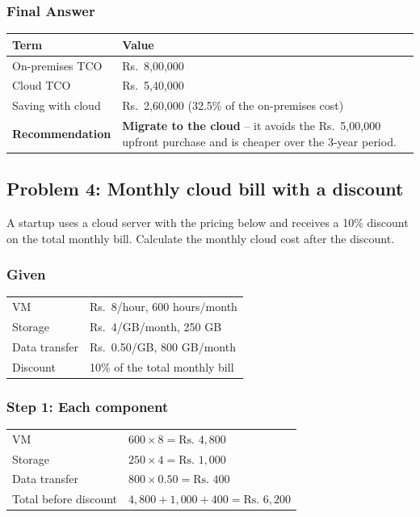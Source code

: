 \documentclass[11pt,a4paper]{article}
\begin{document}
\subsubsection*{Final Answer}

\begin{tabularx}{\textwidth}{@{}lX@{}}
\toprule
\rowcolor{tablehead}\textbf{Term} & \textbf{Value} \\
\midrule
On-premises TCO & Rs.\ 8,00,000 \\
Cloud TCO & Rs.\ 5,40,000 \\
Saving with cloud & Rs.\ 2,60,000 (32.5\% of the on-premises cost) \\
\textbf{Recommendation} & \textbf{Migrate to the cloud} -- it avoids the Rs.\ 5,00,000
  upfront purchase and is cheaper over the 3-year period. \\
\bottomrule
\end{tabularx}

\subsection*{Problem 4: Monthly cloud bill with a discount}

A startup uses a cloud server with the pricing below and receives a 10\% discount on the total
monthly bill. Calculate the monthly cloud cost after the discount.

\subsubsection*{Given}

\begin{tabularx}{\textwidth}{@{}lX@{}}
VM & Rs.\ 8/hour, 600 hours/month \\
Storage & Rs.\ 4/GB/month, 250 GB \\
Data transfer & Rs.\ 0.50/GB, 800 GB/month \\
Discount & 10\% of the total monthly bill \\
\end{tabularx}

\subsubsection*{Step 1: Each component}

\begin{tabularx}{\textwidth}{@{}lX@{}}
VM & $600 \times 8 = \text{Rs. } 4{,}800$ \\
Storage & $250 \times 4 = \text{Rs. } 1{,}000$ \\
Data transfer & $800 \times 0.50 = \text{Rs. } 400$ \\
Total before discount & $4{,}800 + 1{,}000 + 400 = \text{Rs. } 6{,}200$ \\
\end{tabularx}
\end{document}
